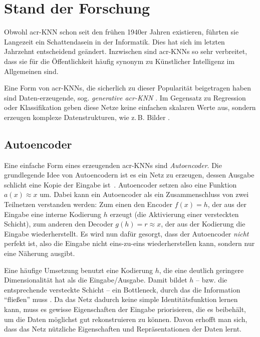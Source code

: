 \chapter{Stand der Forschung}\label{chp:forschungsstand} %
\glsresetall

Obwohl \gls{acr-KNN} schon seit den frühen 1940er Jahren existieren, führten sie
Langezeit ein Schattendasein in der Informatik. Dies hat sich im letzten
Jahrzehnt entscheidend geändert. Inzwischen sind \gls{acr-KNN}s so sehr
verbreitet, dass sie für die Öffentlichkeit häufig synonym zu Künstlicher
Intelligenz im Allgemeinen sind.

Eine Form von \gls{acr-KNN}s, die
sicherlich zu dieser Popularität beigetragen haben sind Da\-ten-\-er\-zeu\-gen\-de, sog.
\emph{generative \gls{acr-KNN}} \cite{goodfellow2014generative,
kingma2019introduction}. Im Gegensatz zu Regression oder Klassifikation geben
diese Netze keine einfachen skalaren Werte aus, sondern erzeugen komplexe
Datenstrukturen, wie z.\,B. Bilder \cite[S. 100ff.]{goodfellow2016deep}.

\section{Autoencoder}

Eine einfache Form eines erzeugenden \gls{acr-KNN}s sind
\emph{Autoencoder}. Die grundlegende Idee von Autoencodern ist es ein Netz zu
erzeugen, dessen Ausgabe schlicht eine Kopie der Eingabe ist~\cite[S.
502]{goodfellow2016deep}. Autoencoder setzen also eine Funktion $a(x) \approx x$
um. Dabei kann ein Autoencoder als ein Zusammenschluss von zwei Teilnetzen
verstanden werden: Zum einen den Encoder $f(x) = h$, der aus der Eingabe eine
interne Kodierung $h$ erzeugt (die Aktivierung einer versteckten Schicht), zum
anderen den Decoder $g(h) = r \approx x$, der aus der Kodierung die Eingabe
wiederherstellt. Es wird nun dafür gesorgt, dass der Autoencoder \emph{nicht}
perfekt ist, also die Eingabe nicht eins-zu-eins wiederherstellen kann, sondern
nur eine Näherung ausgibt.

Eine häufige Umsetzung benutzt eine Kodierung $h$,
die eine deutlich geringere Dimensionalität hat als die Eingabe/Ausgabe. Damit
bildet $h$ – bzw. die entsprechende versteckte Schicht – ein Bottleneck, durch das
die Information \enquote{fließen} muss \cites[S.503]{goodfellow2016deep}[S. 620f.]{raschka2019}. Da das Netz dadurch keine simple
Identitätsfunktion lernen kann, muss es gewisse Eigenschaften der Eingabe
priorisieren, die es beibehält, um die Daten möglichst gut rekonstruieren zu können.
Davon erhofft man sich, dass das Netz nützliche Eigenschaften und
Repräsentationen der Daten lernt.

